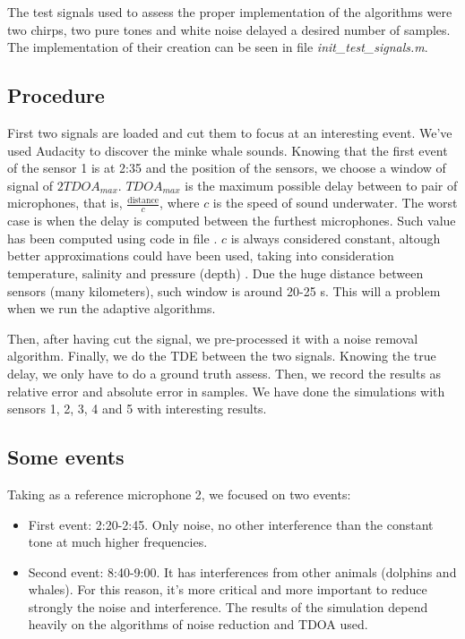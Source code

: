   The test signals used to assess the proper implementation of the algorithms were two chirps, two pure tones and white noise delayed a desired number of samples. The implementation of their creation can be seen in file \emph{init\_test\_signals.m}\cite{inittestsignals.m}.
  
\subsection{Procedure}
  First two signals are loaded and cut them to focus at an interesting event. We've used Audacity to discover the minke whale sounds. Knowing that the first event of the sensor 1 is at 2:35 and the position of the sensors, we choose a window of signal of $2 TDOA_{max}$. $TDOA_{max}$ is the maximum possible delay between to pair of microphones, that is, $\frac{\text{distance}}{c}$, where $c$ is the speed of sound underwater. The worst case is when the delay is computed between the furthest microphones. Such value has been computed using code in file \cite{maxdelay.m}. $c$ is always considered constant, altough better approximations could have been used, taking into consideration temperature, salinity and pressure (depth) \cite{speed-sound-seawater}. Due the huge distance between sensors (many kilometers), such window is around 20-25 s. This will a problem when we run the adaptive algorithms.

  Then, after having cut the signal, we pre-processed it with a noise removal algorithm. Finally, we do the TDE between the two signals. Knowing the true delay, we only have to do a ground truth assess. Then, we record the results as relative error and absolute error in samples. We have done the simulations with sensors 1, 2, 3, 4 and 5 with interesting results.

\subsection{Some events}
  Taking as a reference microphone 2, we focused on two events:
  \begin{itemize}
    \item First event: 2:20-2:45. Only noise, no other interference than the constant tone at much higher frequencies.
    \item Second event: 8:40-9:00. It has interferences from other animals (dolphins and whales). For this reason, it's more critical and more important to reduce strongly the noise and interference. The results of the simulation depend heavily on the algorithms of noise reduction and TDOA used.
  \end{itemize}
